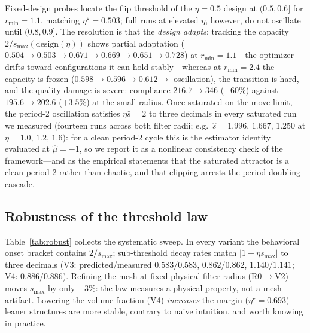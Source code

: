 \documentclass[11pt,a4paper]{article}
\newcommand{\smax}{s_{\max}}
\newcommand{\etastar}{\eta^{\star}}
\begin{document}
Fixed-design probes locate the flip threshold of the $\eta{=}0.5$ design at
$(0.5,0.6]$ for $r_{\min}=1.1$, matching $\etastar=0.503$; full runs at
elevated $\eta$, however, do not oscillate until $(0.8,0.9]$. The
resolution is that the \emph{design adapts}: tracking the capacity
$2/\smax(\mathrm{design}(\eta))$ shows partial adaptation
($0.504\to0.503\to0.671\to0.669\to0.651\to0.728$) at $r_{\min}=1.1$---the
optimizer drifts toward configurations it can hold stably---whereas at
$r_{\min}=2.4$ the capacity is frozen
($0.598\to0.596\to0.612\to$ oscillation), the transition is hard, and the
quality damage is severe: compliance $216.7\to346$ ($+60\%$) against
$195.6\to202.6$ ($+3.5\%$) at the small radius. Once saturated on the move
limit, the period-2 oscillation satisfies $\eta\hat s=2$ to three
decimals in every saturated run we measured (fourteen runs across both
filter radii; e.g.\ $\hat s = 1.996,\,1.667,\,1.250$ at
$\eta=1.0,\,1.2,\,1.6$): for a clean
period-2 cycle this is the estimator identity evaluated at $\hat\mu=-1$,
so we report it as a nonlinear consistency check of the framework---and as
the empirical statements that the saturated attractor is a clean period-2
rather than chaotic, and that clipping arrests the period-doubling
cascade.

\subsection{Robustness of the threshold law}\label{sec:robust}

Table~\ref{tab:robust} collects the systematic sweep. In every variant the
behavioral onset bracket contains $2/\smax$; sub-threshold decay rates
match $|1-\eta\smax|$ to three decimals (V3: predicted/measured
$0.583/0.583$, $0.862/0.862$, $1.140/1.141$; V4: $0.886/0.886$). Refining
the mesh at fixed physical filter radius (R0$\to$V2) moves $\smax$ by only
$-3\%$: the law measures a physical property, not a mesh artifact.
Lowering the volume fraction (V4) \emph{increases} the margin
($\etastar=0.693$)---leaner structures are more stable, contrary to naive
intuition, and worth knowing in practice.
\end{document}
